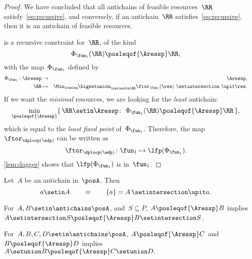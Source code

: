 \begin{proof}
    We have concluded that all antichains of feasible resources~$\RR$ satisfy~\cref{eq:recursive}, and conversely, if an antichain~$\RR$ satisfies~\cref{eq:recursive}, then it is an antichain of feasible resources.

     is a recursive constraint for~$\RR$, of the kind
    \begin{equation*}
        \Phi_{\fun_{1}}(\RR)\posleqof{\Aressp}\RR,
    \end{equation*}
    with the map~$\Phi_{\fun_{1}}$ defined by
    \begin{eqnarray}
        \Phi_{\fun_{1}}:\Aressp & \to     & \Aressp,\label{eq:bigphi} \\
        \RR                     & \mapsto & \Min_{\resleq}\bigsetunion_{\res\setin\RR}\ftor_{\fun_{1}}(\res)\ \setintersection\ \upit\res.\nonumber
    \end{eqnarray}
    If we want the \emph{minimal} resources, we are looking for the \emph{least} antichain:
    \begin{equation*}
        \min_{\posleqof{\Aressp}}\{\,\RR\setin\Aressp\colon\ \Phi_{\fun_{1}}(\RR)\posleqof{\Aressp}\RR\,\},
    \end{equation*}
    which is equal to the \emph{least fixed point }of~$\Phi_{\fun_{1}}$.
    Therefore, the map $\ftor_{\dploop(\adp)}$ can be written as
    \begin{equation}
        \ftor_{\dploop(\adp)}\colon\fun_{1}\mapsto\lfp(\Phi_{\fun_{1}}).
        \label{eq:loop_fixpoint}
    \end{equation}
    \cref{lem:dagger} shows that $\lfp(\Phi_{\fun_{1}})$ is \scottcontinuous in~$\fun_{1}$.
\end{proof}

\begin{lemma}
    \label{lem:antichain-write}
    Let~$A$ be an antichain in~$\posA$.
    Then
    \begin{equation*}
        a\setin A\qquad\equiv\qquad\{a\}=A\,\setintersection\upit a.
    \end{equation*}
\end{lemma}

\begin{lemma}
    \label{lem:antichain_inter}
    For~$A,B\setin\antichains\posA$, and~$S\subseteq P$,
    $A\posleqof{\Aressp}B$ implies $A\setintersection S\posleqof{\Aressp}B\setintersection S$.
\end{lemma}

\begin{lemma}
    \label{lem:antichain_union}
    For~$A,B,C,D\setin\antichains\posA$, $A\posleqof{\Aressp}C$
    and $B\posleqof{\Aressp}D$ implies $A\setunion B\posleqof{\Aressp}C\setunion D.
    $
\end{lemma}

